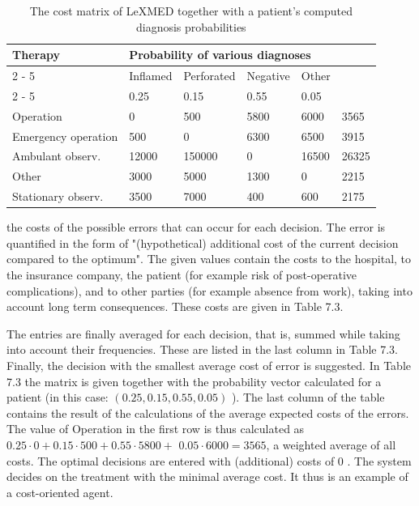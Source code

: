 \documentclass[10pt]{book}
\begin{document}
\begin{table}[t]
\centering
\caption{The cost matrix of LeXMED together with a patient's computed diagnosis probabilities}
\begin{tabular}{|l|l|l|l|l|l|}
\hline
\multirow[t]{3}{*}{Therapy} & \multicolumn{4}{|l|}{Probability of various diagnoses} & \multirow{3}{*}{} \\
\cline{ 2 - 5 }
 & Inflamed & Perforated & Negative & Other &  \\
\cline{ 2 - 5 }
 & 0.25 & 0.15 & 0.55 & 0.05 &  \\
\hline
Operation & 0 & 500 & 5800 & 6000 & 3565 \\
\hline
Emergency operation & 500 & 0 & 6300 & 6500 & 3915 \\
\hline
Ambulant observ. & 12000 & 150000 & 0 & 16500 & 26325 \\
\hline
Other & 3000 & 5000 & 1300 & 0 & 2215 \\
\hline
Stationary observ. & 3500 & 7000 & 400 & 600 & 2175 \\
\hline
\end{tabular}
\end{table}

the costs of the possible errors that can occur for each decision. The error is quantified in the form of "(hypothetical) additional cost of the current decision compared to the optimum". The given values contain the costs to the hospital, to the insurance company, the patient (for example risk of post-operative complications), and to other parties (for example absence from work), taking into account long term consequences. These costs are given in Table 7.3.

The entries are finally averaged for each decision, that is, summed while taking into account their frequencies. These are listed in the last column in Table 7.3. Finally, the decision with the smallest average cost of error is suggested. In Table 7.3 the matrix is given together with the probability vector calculated for a patient (in this case: $(0.25,0.15,0.55,0.05)$ ). The last column of the table contains the result of the calculations of the average expected costs of the errors. The value of Operation in the first row is thus calculated as $0.25 \cdot 0+0.15 \cdot 500+0.55 \cdot 5800+$ $0.05 \cdot 6000=3565$, a weighted average of all costs. The optimal decisions are entered with (additional) costs of 0 . The system decides on the treatment with the minimal average cost. It thus is an example of a cost-oriented agent.
\end{document}
